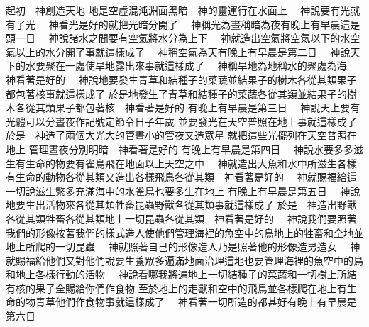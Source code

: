 \bchapter%
起初　神創造天地\chuan{}
地是空虛混沌\yuentien 淵面黑暗\yuentien 　神的靈運行在水面上\chuan%
　神說\chientien 要有光\chientien 就有了光\chuan%
　神看光是好的\chientien 就把光暗分開了\chuan%
　神稱光為晝\chientien 稱暗為夜\yuentien 有晚上\chientien 有早晨\chientien 這是頭一日\chuan\Chuan%
　神說\chientien 諸水之間要有空氣\chientien 將水分為上下\chuan 
{}　神就造出空氣\chientien 將空氣以下的水\chientien 空氣以上的水分開了\yuentien 事就這樣成了\chuan 
{}　神稱空氣為天\yuentien 有晚上\chientien 有早晨\chientien 是第二日\chuan\Chuan
{}　神說\chientien 天下的水要聚在一處\chientien 使旱地露出來\yuentien 事就這樣成了\chuan 
{}　神稱旱地為地\chientien 稱水的聚處為海\yuentien 　神看著是好的\chuan 
{}　神說\chientien 地要發生青草\chientien 和結種子的菜蔬\chientien 並結果子的樹木\chientien 各從其類\chientien 果子都包著核\yuentien 事就這樣成了\chuan 
{}於是地發生了青草\chientien 和結種子的菜蔬\chientien 各從其類\chientien 並結果子的樹木\chientien 各從其類\chientien 果子都包著核\chuan 　神看著是好的\yuentien%
有晚上\chientien 有早晨\chientien 是第三日\chuan\Chuan
{}　神說\chientien 天上要有光體\chientien 可以分晝夜\chientien 作記號\chientien 定節令\chientien 日子\chientien 年歲\yuentien 
{}並要發光在天空\chientien 普照在地上\yuentien 事就這樣成了\chuan%
於是　神造了兩個大光\chientien 大的管晝\chientien 小的管夜\yuentien 又造眾星\chuan 
{}就把這些光擺列在天空\chientien 普照在地上\chientien 
{}管理晝夜\chientien 分別明暗\yuentien 　神看著是好的\yuentien 
{}有晚上\chientien 有早晨\chientien 是第四日\chuan\Chuan
{}　神說\chientien 水要多多滋生有生命的物\yuentien 要有雀鳥飛在地面以上\chientien 天空之中\chuan 
{}　神就造出大魚\chientien 和水中所滋生各樣有生命的動物\chientien 各從其類\yuentien 又造出各樣飛鳥\chientien 各從其類\yuentien 　神看著是好的\chuan 
{}　神就賜福給這一切\chientien 說\chientien 滋生繁多\chientien 充滿海中的水\yuentien 雀鳥也要多生在地上\chuan 
{}有晚上\chientien 有早晨\chientien 是第五日\chuan\Chuan
{}　神說\chientien 地要生出活物來\chientien 各從其類\yuentien 牲畜\chientien 昆蟲\chientien 野獸\chientien 各從其類\yuentien 事就這樣成了\chuan 
{}於是　神造出野獸\chientien 各從其類\yuentien 牲畜\chientien 各從其類\yuentien 地上一切昆蟲\chientien 各從其類\yuentien 　神看著是好的\chuan 
{}　神說\chientien 我們要照著我們的形像\chientien 按著我們的樣式造人\chientien 使他們管理海裡的魚\chientien 空中的鳥\chientien 地上的牲畜\chientien 和全地\chientien 並地上所爬的一切昆蟲\chuan 
{}　神就照著自己的形像造人\chientien 乃是照著他的形像造男造女\chuan 
{}　神就賜福給他們\chientien 又對他們說\chientien 要生養眾多\chientien 遍滿地面\chientien 治理這地\yuentien 也要管理海裡的魚\chientien 空中的鳥\yuentien 和地上各樣行動的活物\chuan 
{}　神說\chientien 看哪\chientien 我將遍地上一切結種子的菜蔬\chientien 和一切樹上所結有核的果子\chientien 全賜給你們作食物\chuan 
{}至於地上的走獸\chientien 和空中的飛鳥\chientien 並各樣爬在地上有生命的物\chientien {}青草他們作食物\yuentien 事就這樣成了\chuan 
{}　神看著一切所造的都甚好\yuentien 有晚上\chientien 有早晨\chientien 是第六日\chuan 
